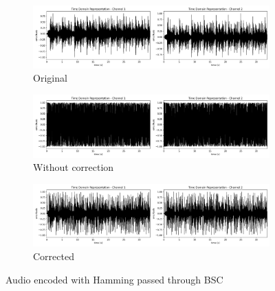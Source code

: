 \documentclass{article}
\begin{document}
\begin{figure}
    \centering
    \begin{subfigure}[b]{\textwidth}
        \centering
        \includegraphics[width=\textwidth]{../Result/wav-time-domain-TX.png}
        \caption{Original}
        \label{fig:t-audio-hamming-bsc-original}
    \end{subfigure}
    \begin{subfigure}[b]{\textwidth}
        \centering
        \includegraphics[width=\textwidth]{../Result/wav-time-domain-RX.png}
        \caption{Without correction}
        \label{fig:t-audio-hamming-bsc-no-correction}
    \end{subfigure}
    \begin{subfigure}[b]{\textwidth}
        \centering
        \includegraphics[width=\textwidth]{../Result/wav-time-domain-RX-corrected.png}
        \caption{Corrected}
        \label{fig:t-audio-hamming-bsc-corrected}
    \end{subfigure}
       \caption{Audio encoded with Hamming passed through BSC}
       \label{fig:t-audio-hamming-bsc}
\end{figure}
\end{document}
